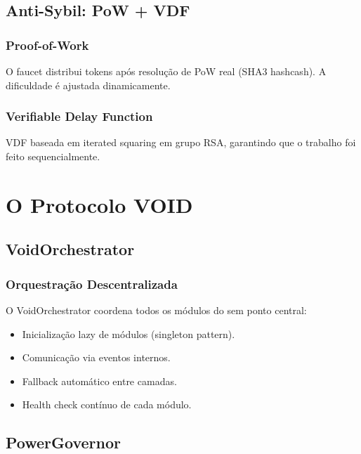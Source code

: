 \documentclass[12pt,a4paper,twoside]{book}
\theoremstyle{remark}
\newcommand{\ET}{\text{ETΞRNET}}
\begin{document}
\chapter{Anti-Sybil: PoW + VDF}
\label{chap:antisybil}

\section{Proof-of-Work}

O faucet distribui tokens após resolução de PoW real (SHA3 hashcash). A dificuldade é ajustada dinamicamente.

\section{Verifiable Delay Function}

VDF baseada em iterated squaring em grupo RSA, garantindo que o trabalho foi feito sequencialmente.

\part{O Protocolo VOID}

\chapter{VoidOrchestrator}
\label{chap:voidorchestrator}

\section{Orquestração Descentralizada}

O VoidOrchestrator coordena todos os módulos do \ET{} sem ponto central:

\begin{itemize}
    \item Inicialização lazy de módulos (singleton pattern).
    \item Comunicação via eventos internos.
    \item Fallback automático entre camadas.
    \item Health check contínuo de cada módulo.
\end{itemize}

\chapter{PowerGovernor}
\label{chap:powergovernor}
\end{document}

